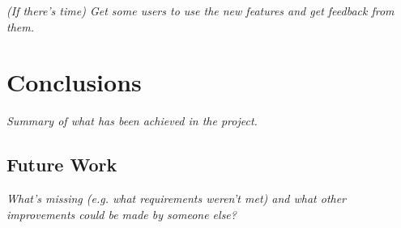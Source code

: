 \documentclass[authoryearcitations]{UoYCSproject}
\begin{document}
\emph{(If there's time) Get some users to use the new features and get feedback
from them.}

\clearpage


\chapter{Conclusions}
\label{cha:Conclusions}

\emph{Summary of what has been achieved in the project.}


\section{Future Work}
\label{sec:FutureWork}

\emph{What's missing (e.g. what requirements weren't met) and what other
improvements could be made by someone else?}

\clearpage



\end{document}

